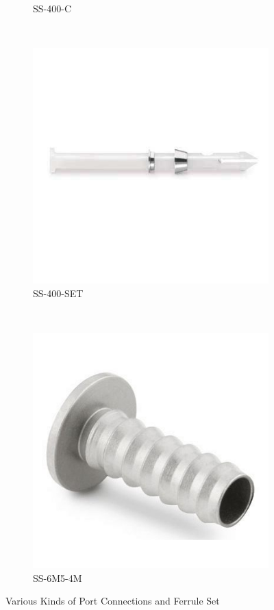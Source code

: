 \documentclass[a4paper,12pt,oneside]{article}
\begin{document}
\begin{appendices}
\begin{figure}[H]
\begin{subfigure}[b]{0.21\textwidth}
    \caption{SS-400-C}
    \end{subfigure}
    ~
    \begin{subfigure}[b]{0.21\textwidth}
    \centering
    \includegraphics[width=\textwidth]{appendix/img/interfaces/SS-400-SET.jpg}
    \caption{SS-400-SET}
    \end{subfigure}
    ~
    \begin{subfigure}[b]{0.21\textwidth}
    \centering
    \includegraphics[width=\textwidth]{appendix/img/interfaces/SS-6M5-4M.jpg}
    \caption{SS-6M5-4M}
    \end{subfigure}
    \caption{Various Kinds of Port Connections and Ferrule Set}
    \label{Appx:Other_fittings}
\end{figure}



\end{appendices}
\end{document}
